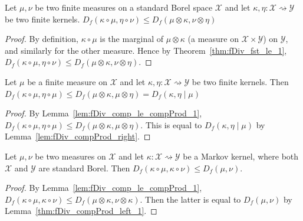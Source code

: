\begin{lemma}
  \label{lem:fDiv_comp_le_compProd_1}
  \leanok
  Let $\mu, \nu$ be two finite measures on a standard Borel space $\mathcal X$ and let $\kappa, \eta : \mathcal X \rightsquigarrow \mathcal Y$ be two finite kernels.
  $D_f(\kappa \circ \mu, \eta \circ \nu) \le D_f(\mu \otimes \kappa, \nu \otimes \eta)$
\end{lemma}

\begin{proof}\leanok
{}
By definition, $\kappa \circ \mu$ is the marginal of $\mu \otimes \kappa$ (a measure on $\mathcal X \times \mathcal Y$) on $\mathcal Y$, and similarly for the other measure. Hence by Theorem~\ref{thm:fDiv_fst_le_1}, $D_f(\kappa \circ \mu, \eta \circ \nu) \le D_f(\mu \otimes \kappa, \nu \otimes \eta)$. 
\end{proof}


\begin{theorem}
  \label{thm:fDiv_comp_le_condFDiv_1}
  \leanok
  Let $\mu$ be a finite measure on $\mathcal X$ and let $\kappa, \eta : \mathcal X \rightsquigarrow \mathcal Y$ be two finite kernels.
  Then $D_f(\kappa \circ \mu, \eta \circ \mu) \le D_f(\mu \otimes \kappa, \mu \otimes \eta) = D_f(\kappa, \eta \mid \mu)$
\end{theorem}

\begin{proof}\leanok
{}
By Lemma~\ref{lem:fDiv_comp_le_compProd_1}, $D_f(\kappa \circ \mu, \eta \circ \mu) \le D_f(\mu \otimes \kappa, \mu \otimes \eta)$. This is equal to $D_f(\kappa, \eta \mid \mu)$ by Lemma~\ref{lem:fDiv_compProd_right}.
\end{proof}


\begin{theorem}
  \label{thm:fDiv_data_proc_1}
  \leanok
  Let $\mu, \nu$ be two measures on $\mathcal X$ and let $\kappa : \mathcal X \rightsquigarrow \mathcal Y$ be a Markov kernel, where both $\mathcal X$ and $\mathcal Y$ are standard Borel.
  Then $D_f(\kappa \circ \mu, \kappa \circ \nu) \le D_f(\mu, \nu)$.
\end{theorem}

\begin{proof}\leanok
{}
By Lemma~\ref{lem:fDiv_comp_le_compProd_1}, $D_f(\kappa \circ \mu, \kappa \circ \nu) \le D_f(\mu \otimes \kappa, \nu \otimes \kappa)$. Then the latter is equal to $D_f(\mu, \nu)$ by Lemma~\ref{thm:fDiv_compProd_left_1}.
\end{proof}



